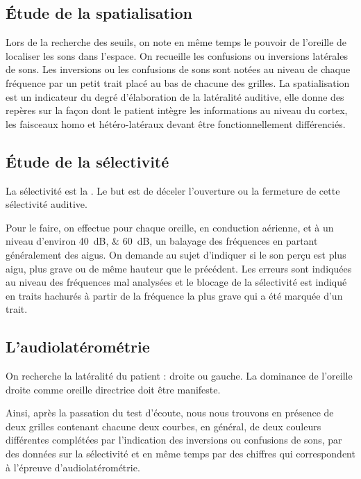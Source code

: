 \subsection{\'Etude de la spatialisation}

Lors de la recherche des seuils, on note en même temps le pouvoir
de l'oreille de localiser les sons dans l'espace. On recueille les
confusions ou inversions latérales de sons. Les inversions ou les
confusions de sons sont notées au niveau de chaque fréquence par un
petit trait placé au bas de chacune des grilles. La spatialisation
est un indicateur du degré d'élaboration de la latéralité auditive,
elle donne des repères sur la façon dont le patient intègre les informations
au niveau du cortex, les faisceaux homo et hétéro-latéraux devant
être fonctionnellement différenciés. 


\subsection{\'Etude de la sélectivité}

La sélectivité est la \autocite{tomatis:loreille}.
Le but est de déceler l'ouverture ou la fermeture de cette sélectivité
auditive. 

Pour le faire, on effectue pour chaque oreille, en conduction
aérienne, et à un niveau d'environ \SIlist{40;60}{\dB}, un balayage des
fréquences en partant généralement des aigus. On demande au sujet
d'indiquer si le son perçu est plus aigu, plus grave ou de même hauteur
que le précédent. Les erreurs sont indiquées au niveau des fréquences
mal analysées et le blocage de la sélectivité est indiqué en traits
hachurés à partir de la fréquence la plus grave qui a été marquée
d'un trait. 
\subsection{L'audiolatérométrie}

On recherche la latéralité du patient : droite ou gauche. La dominance
de l'oreille droite comme oreille directrice doit être manifeste.

Ainsi, après la passation du test d\textquoteright écoute, nous nous
trouvons en présence de deux grilles contenant chacune deux courbes,
en général, de deux couleurs différentes complétées par l'indication
des inversions ou confusions de sons, par des données sur la sélectivité
et en même temps par des chiffres qui correspondent à l'épreuve d'audiolatérométrie.

